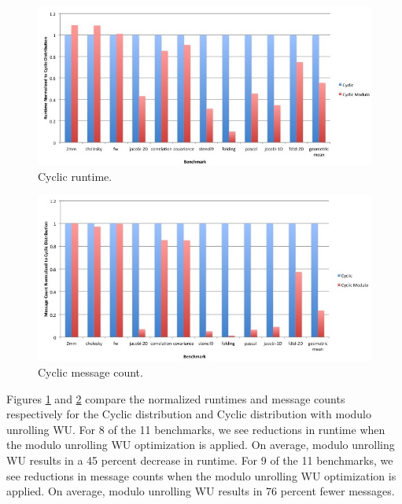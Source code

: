 \begin{figure}
	\begin{center}
	\includegraphics[scale=0.30]{./Figures/cyclic_runtime}
	\caption{Cyclic runtime.}
	\label{cyclic_runtime}
	\end{center}
\end{figure}

\begin{figure}
\begin{center}
\includegraphics[scale=0.30]{./Figures/cyclic_message_count}
\caption{Cyclic message count.}
\label{cyclic_message_count}
\end{center}
\end{figure}

Figures \ref{cyclic_runtime} and \ref{cyclic_message_count} compare the normalized runtimes and message counts respectively for the Cyclic distribution and Cyclic distribution with modulo unrolling WU. For 8 of the 11 benchmarks, we see reductions in runtime when the modulo unrolling WU optimization is applied. On average, modulo unrolling WU results in a 45 percent decrease in runtime. For 9 of the 11 benchmarks, we see reductions in message counts when the modulo unrolling WU optimization is applied. On average, modulo unrolling WU results in 76 percent fewer messages. 

